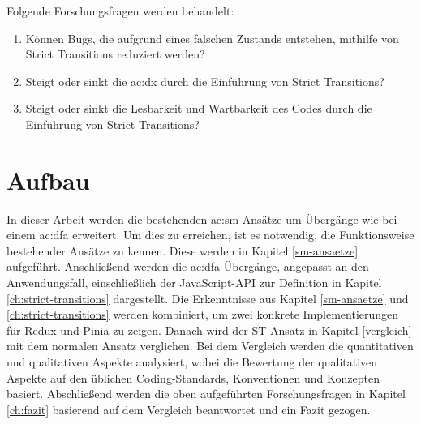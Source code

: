 Folgende Forschungsfragen werden behandelt:

\begin{enumerate}
  \item Können Bugs, die aufgrund eines falschen Zustands entstehen, mithilfe von Strict Transitions reduziert werden?
  \item Steigt oder sinkt die \acrshort{ac:dx} durch die Einführung von Strict Transitions?
  \item Steigt oder sinkt die Lesbarkeit und Wartbarkeit des Codes durch die Einführung von Strict Transitions?
\end{enumerate}

\section{Aufbau}

In dieser Arbeit werden die bestehenden \acrshort{ac:sm}-Ansätze um Übergänge wie bei einem \acrshort{ac:dfa} erweitert. Um dies zu erreichen, ist es notwendig, die Funktionsweise bestehender Ansätze zu kennen. Diese werden in Kapitel \ref{sm-ansaetze} aufgeführt. Anschließend werden die \acrshort{ac:dfa}-Übergänge, angepasst an den Anwendungsfall, einschließlich der JavaScript-API zur Definition in Kapitel \ref{ch:strict-transitions} dargestellt. Die Erkenntnisse aus Kapitel \ref{sm-ansaetze} und \ref{ch:strict-transitions} werden kombiniert, um zwei konkrete Implementierungen für Redux und Pinia zu zeigen. Danach wird der ST-Ansatz in Kapitel \ref{vergleich} mit dem normalen Ansatz verglichen. Bei dem Vergleich werden die quantitativen und qualitativen Aspekte analysiert, wobei die Bewertung der qualitativen Aspekte auf den üblichen Coding-Standards, Konventionen und Konzepten basiert. Abschließend werden die oben aufgeführten Forschungsfragen in Kapitel \ref{ch:fazit} basierend auf dem Vergleich beantwortet und ein Fazit gezogen.

